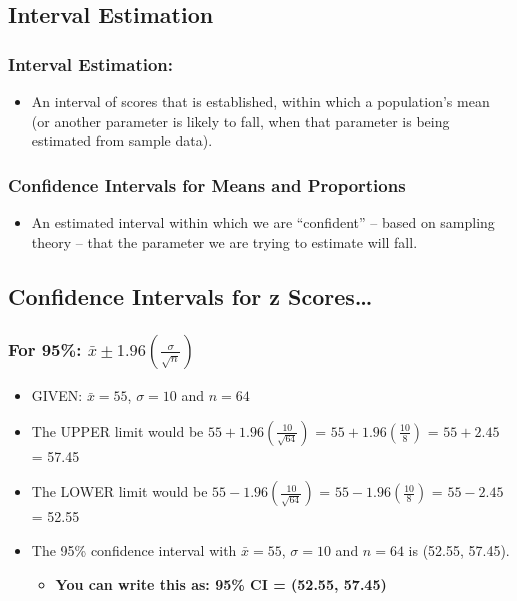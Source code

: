 \documentclass[]{article}
\begin{document}
\subsection{Interval Estimation}\label{interval-estimation}

\subsubsection{Interval Estimation:}\label{interval-estimation-1}

\begin{itemize}
\itemsep1pt\parskip0pt
\item
  An interval of scores that is established, within which a population's
  mean (or another parameter is likely to fall, when that parameter is
  being estimated from sample data).
\end{itemize}

\subsubsection{Confidence Intervals for Means and
Proportions}\label{confidence-intervals-for-means-and-proportions}

\begin{itemize}
\itemsep1pt\parskip0pt
\item
  An estimated interval within which we are ``confident'' -- based on
  sampling theory -- that the parameter we are trying to estimate will
  fall.
\end{itemize}

\subsection{Confidence Intervals for z
Scores\ldots{}}\label{confidence-intervals-for-z-scores}

\subsubsection{For 95\%:
$\bar{x} \pm 1.96(\frac{\sigma}{\sqrt{n}})$}\label{for-95-barx-pm-1.96fracsigmasqrtn}

\begin{itemize}
\itemsep1pt\parskip0pt
\item
  GIVEN: $\bar{x}=55$, $\sigma = 10$ and $n=64$
\item
  The UPPER limit would be $55 + 1.96(\frac{10}{\sqrt{64}})$ =
  $55 + 1.96(\frac{10}{8})$ = $55 + 2.45$ = 57.45
\item
  The LOWER limit would be $55 - 1.96(\frac{10}{\sqrt{64}})$ =
  $55 - 1.96(\frac{10}{8})$ = $55 - 2.45$ = 52.55
\item
  The 95\% confidence interval with $\bar{x}=55$, $\sigma = 10$ and
  $n=64$ is (52.55, 57.45).

  \begin{itemize}
  \itemsep1pt\parskip0pt
  \item
    \textbf{You can write this as: 95\% CI = (52.55, 57.45)}
  \end{itemize}
\end{itemize}
\end{document}
